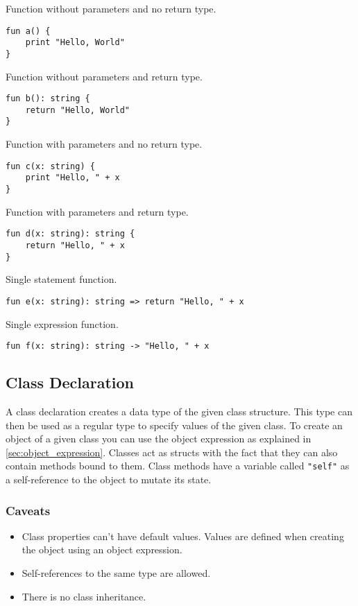 Function without parameters and no return type.
\begin{verbatim}
fun a() {
    print "Hello, World"
}
\end{verbatim}
Function without parameters and return type.
\begin{verbatim}
fun b(): string {
    return "Hello, World"
}
\end{verbatim}
Function with parameters and no return type.
\begin{verbatim}
fun c(x: string) {
    print "Hello, " + x
}
\end{verbatim}
Function with parameters and return type.
\begin{verbatim}
fun d(x: string): string {
    return "Hello, " + x
}
\end{verbatim}
Single statement function.
\begin{verbatim}
fun e(x: string): string => return "Hello, " + x
\end{verbatim}
Single expression function.
\begin{verbatim}
fun f(x: string): string -> "Hello, " + x
\end{verbatim}

\subsection{Class Declaration}

A class declaration creates a data type of the given class structure. This type can then be used as a regular type
to specify values of the given class. To create an object of a given class you can use the object expression as explained in \autoref{sec:object_expression}.
Classes act as structs with the fact that they can also contain methods bound to them. Class methods have a variable called \texttt{"self"}
as a self-reference to the object to mutate its state.

\subsubsection{Caveats}

\begin{itemize}
    \item Class properties can't have default values. Values are defined when creating the object using an object expression.
    \item Self-references to the same type are allowed.
    \item There is no class inheritance.
\end{itemize}
\clearpage
